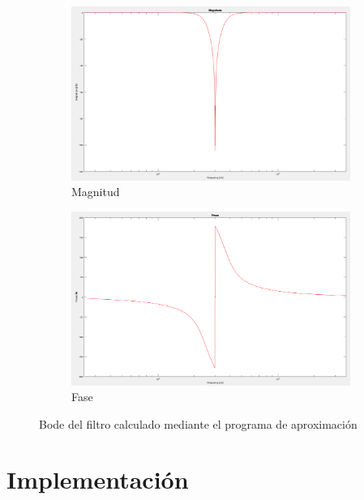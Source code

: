 \begin{figure}[ht!]
    \centering
    \begin{subfigure}{.8\textwidth}
        \centering
        \includegraphics[width=.8\linewidth]{../Ex4/Resources/ej4_teorico_magnitud.png}  
        \caption{Magnitud}
    
    \end{subfigure}
    \begin{subfigure}{.8\textwidth}
        \centering
        \includegraphics[width=.8\linewidth]{../Ex4/Resources/ej4_teorico_fase.png}  
        \caption{Fase}

    \end{subfigure}
    \caption{Bode del filtro calculado mediante el programa de aproximación}
    \label{fig:ej4_bode_teorico}
    \end{figure}





\section{Implementación}

